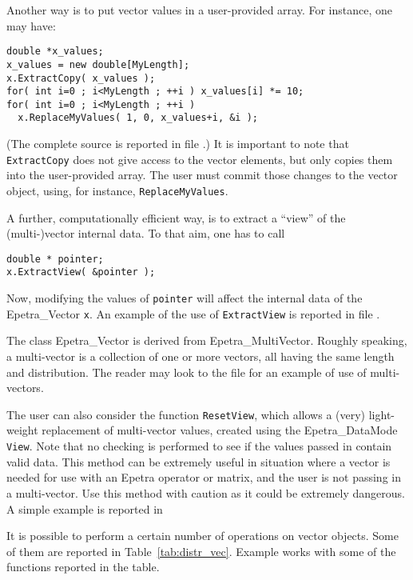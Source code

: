 Another way is to put vector values in a user-provided array. For
instance, one may have:
\begin{verbatim}
double *x_values;
x_values = new double[MyLength];
x.ExtractCopy( x_values );
for( int i=0 ; i<MyLength ; ++i ) x_values[i] *= 10;
for( int i=0 ; i<MyLength ; ++i ) 
  x.ReplaceMyValues( 1, 0, x_values+i, &i );
\end{verbatim}
(The complete source is reported in file .)  It
is important to note that \verb!ExtractCopy! does not give access to the
vector elements, but only copies them into the user-provided array.  The
user must commit those changes to the vector object, using, for
instance, \verb!ReplaceMyValues!.

A further, computationally efficient way, is to extract a ``view'' of the
(multi-)vector internal data.  To that aim, one has to call
\begin{verbatim}
double * pointer;
x.ExtractView( &pointer );
\end{verbatim}
Now, modifying the values of \verb!pointer! will affect the internal
data of the Epetra\_Vector \verb!x!.  An example of the use of
\verb!ExtractView! is reported in file .

\begin{remark}
  The class Epetra\_Vector is derived from Epetra\_MultiVector. Roughly
  speaking, a multi-vector is a collection of one or more vectors, all
  having the same length and distribution. The reader may look to the
  file  for an example of use of multi-vectors.
\end{remark}

The user can also consider the function \verb!ResetView!, which allows a
(very) light-weight replacement of multi-vector values, created using
the Epetra\_DataMode \verb!View!. Note that no checking is performed to
see if the values passed in contain valid data. This method can be
extremely useful in situation where a vector is needed for use with an
Epetra operator or matrix, and the user is not passing in a
multi-vector. Use this method with caution as it could be extremely
dangerous.
A simple example is reported in 

\medskip

It is possible to perform a certain number of operations on vector
objects. Some of them are reported in Table~\ref{tab:distr_vec}.
Example  works with some of the functions reported in
the table.

